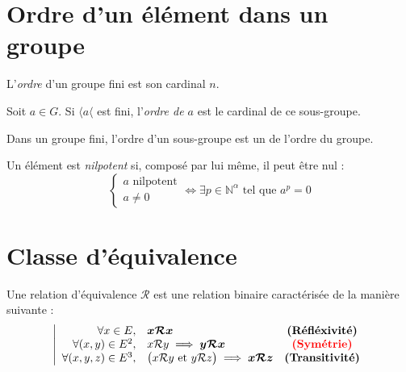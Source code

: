 \documentclass[11pt,a4paper,fleqn,pdftex]{report}
\begin{document}
\section{Ordre d'un élément dans un groupe} %
\label{sec:ordre_d_un_element_dans_un_groupe}
\begin{dfn}
     L'\emph{ordre} d'un groupe fini est son cardinal $n$.
\end{dfn}
\begin{dfn}
     Soit $a\in G$. Si $\langle a \langle$ est fini, l'\emph{ordre de $a$} est le cardinal de ce sous-groupe.
\end{dfn}
\begin{itheorem}
     Dans un groupe fini, l'ordre d'un sous-groupe est un  de l'ordre du groupe.
\end{itheorem}
\begin{dfn}
Un élément est \emph{nilpotent} si, composé par lui même, il peut être nul : 
\begin{equation}
\left\lbrace \begin{array}{l} a\text{ nilpotent}\\ a\neq 0 \end{array}\right. \Leftrightarrow \exists p \in \mathbb{N}^{\alpha} \text{ tel que } a^p =0 
\end{equation}
\end{dfn}
\section{Classe d'équivalence}
\begin{dfn}
Une relation d'équivalence $\mathcal{R}$ est une relation binaire caractérisée de la manière suivante : 
\begin{equation}
\left|
\begin{array}{r l c}
\forall x \in E,& \boldsymbol{x\mathcal{R}x} & \text{\textbf{(Réfléxivité)}}\\
\forall (x,y) \in E^2, & x\mathcal{R}y\implies \boldsymbol{y\mathcal{R}x} &\text{\textcolor{couleurImp}{\textbf{(Symétrie)}}}\\
\forall (x,y,z) \in E^3, & \big( x\mathcal{R}y \text{ et } y\mathcal{R}z \big) \implies \boldsymbol{x\mathcal{R}z} & \text{\textbf{(Transitivité)}}
\end{array}
\right.
\end{equation}
\end{dfn}
\end{document}
